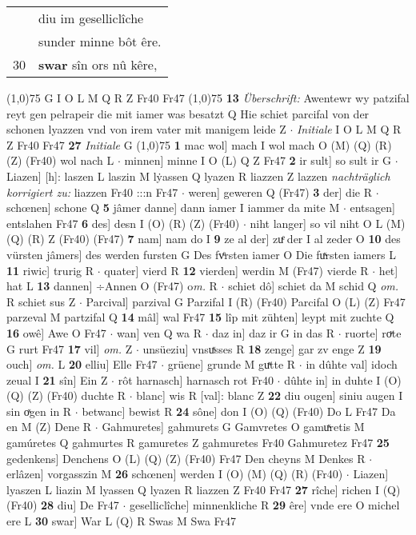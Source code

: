 \documentclass[8pt,a4paper,notitlepage]{article}
\begin{document}
\begin{table}[ht]
\begin{minipage}[t]{0.5\linewidth}
\begin{tabular}{rl}
 & diu im geselliclîche\\ 
 & sunder minne bôt êre.\\ 
30 & \textbf{swar} sîn ors nû kêre,\\ 
\end{tabular}
\scriptsize
\line(1,0){75} \newline
G I O L M Q R Z Fr40 Fr47 \newline
\line(1,0){75} \newline
\textbf{13} \textit{Überschrift:} Awentewr wy patzifal reyt gen pelrapeir die mit iamer was besatzt Q  Hie schiet parcifal von der schonen lyazzen vnd von irem vater mit manigem leide Z   $\cdot$ \textit{Initiale} I O L M Q R Z Fr40 Fr47  \textbf{27} \textit{Initiale} G  \newline
\line(1,0){75} \newline
\textbf{1} mac wol] mach I wol mach O (M) (Q) (R) (Z) (Fr40) wol nach L  $\cdot$ minnen] minne I O (L) Q Z Fr47 \textbf{2} ir sult] so sult ir G  $\cdot$ Liazen] [h]: laszen L laszin M lẏassen Q lyazen R liazzen Z lazzen \textit{nachträglich korrigiert zu:} liazzen Fr40 :::n Fr47  $\cdot$ weren] geweren Q (Fr47) \textbf{3} der] die R  $\cdot$ schœnen] schone Q \textbf{5} jâmer danne] dann iamer I iammer da mite M  $\cdot$ entsagen] entslahen Fr47 \textbf{6} des] desn I (O) (R) (Z) (Fr40)  $\cdot$ niht langer] so vil niht O L (M) (Q) (R) Z (Fr40) (Fr47) \textbf{7} nam] nam do I \textbf{9} ze al der] zuͤ der I al zeder O \textbf{10} des vürsten jâmers] des werden fursten G Des fvͤrsten iamer O Die fuͯrsten iamers L \textbf{11} riwic] trurig R  $\cdot$ quater] vierd R \textbf{12} vierden] werdin M (Fr47) vierde R  $\cdot$ het] hat L \textbf{13} dannen] ÷Annen O (Fr47) o\textit{m. } R  $\cdot$ schiet dô] schiet da M schid Q \textit{om.} R schiet sus Z  $\cdot$ Parcival] parzival G Parzifal I (R) (Fr40) Parcifal O (L) (Z) Fr47 parzeval M partzifal Q \textbf{14} mâl] wal Fr47 \textbf{15} lîp mit zühten] leypt mit zuchte Q \textbf{16} owê] Awe O Fr47  $\cdot$ wan] ven Q wa R  $\cdot$ daz in] daz ir G in das R  $\cdot$ ruorte] roͮte G rurt Fr47 \textbf{17} vil] \textit{om.} Z  $\cdot$ unsüeziu] vnsuͯsses R \textbf{18} zenge] gar zv enge Z \textbf{19} ouch] \textit{om.} L \textbf{20} elliu] Elle Fr47  $\cdot$ grüene] grunde M guͯtte R  $\cdot$ in dûhte val] idoch zeual I \textbf{21} sîn] Ein Z  $\cdot$ rôt harnasch] harnasch rot Fr40  $\cdot$ dûhte in] in duhte I (O) (Q) (Z) (Fr40) duchte R  $\cdot$ blanc] wis R [val]: blanc Z \textbf{22} diu ougen] siniu augen I sin oͯgen in R  $\cdot$ betwanc] bewist R \textbf{24} sône] don I (O) (Q) (Fr40) Do L Fr47 Da en M (Z) Dene R  $\cdot$ Gahmuretes] gahmurets G Gamvretes O gamuͯretis M gamúretes Q gahmurtes R gamuretes Z gahmuretes Fr40 Gahmuretez Fr47 \textbf{25} gedenkens] Denchens O (L) (Q) (Z) (Fr40) Fr47 Den cheyns M Denkes R  $\cdot$ erlâzen] vorgasszin M \textbf{26} schœnen] werden I (O) (M) (Q) (R) (Fr40)  $\cdot$ Liazen] lyaszen L liazin M lyassen Q lyazen R liazzen Z Fr40 Fr47 \textbf{27} rîche] richen I (Q) (Fr40) \textbf{28} diu] De Fr47  $\cdot$ geselliclîche] minnenkliche R \textbf{29} êre] vnde ere O michel ere L \textbf{30} swar] War L (Q) R Swas M Swa Fr47 \newline

\end{minipage}
\end{table}
\end{document}
